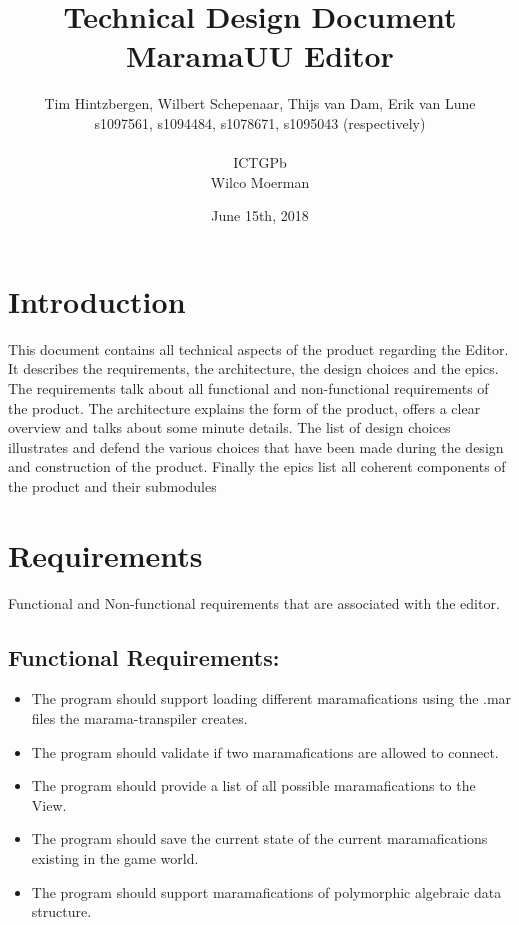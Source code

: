\documentclass[10pt]{extarticle} %
\title{\huge Technical Design Document MaramaUU Editor}
\author{Tim Hintzbergen, Wilbert Schepenaar, Thijs van Dam, Erik van Lune    \\s1097561, s1094484, s1078671, s1095043 (respectively)
\\\\ICTGPb
\\Wilco Moerman}
\date{June 15th, 2018}
\begin{document}
    \nocite{*}
    \maketitle
    \thispagestyle{empty}
    \newpage
    \newpage
    \setcounter{page}{1}
    \section {Introduction}
    This document contains all technical aspects of the product regarding the Editor.
    It describes the requirements, the architecture, the design choices and the epics.
    The requirements talk about all functional and non-functional requirements of the product.
    The architecture explains the form of the product, offers a clear overview and talks about some minute details.
    The list of design choices illustrates and defend the various choices that have been made during the design and construction of the product.
    Finally the epics list all coherent components of the product and their submodules
    \newpage

    \tableofcontents{}
    \newpage

    \section{Requirements}
    Functional and Non-functional requirements that are associated with the editor.
    \subsection{Functional Requirements:}
    \begin{itemize}
        \item The program should support loading different maramafications using the .mar files the marama-transpiler creates.
        \item The program should validate if two maramafications are allowed to connect.
        \item The program should provide a list of all possible maramafications to the View.
        \item The program should save the current state of the current maramafications existing in the game world.
        \item The program should support maramafications of polymorphic algebraic data structure.
    \end{itemize}
\end{document}
